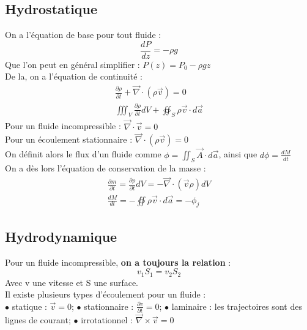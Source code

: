 \documentclass[../main.tex]{subfiles}
\begin{document}
\localtableofcontents
\subsection{Hydrostatique}
On a l'équation de base pour tout fluide : \\
\begin{equation}
    \frac{dP}{dz} = -\rho g
\end{equation}
Que l'on peut en général simplifier : $P(z) = P_0 -\rho gz$\\

De la, on a l'équation de continuité : \\
\begin{equation}
\begin{split}
    \frac{\partial \rho}{\partial t} + \vec{\nabla} \cdot (\rho \vec{v}) = 0 \\
    \iiint_V  \frac{\partial \rho}{\partial t} dV + \oiint_S \rho \vec{v} \cdot d \vec{a}
\end{split}
\end{equation}
Pour un fluide incompressible : $\vec{\nabla} \cdot \vec{v} = 0$\\
Pour un écoulement stationnaire : $\vec{\nabla} \cdot (\rho \vec{v}) = 0$\\

On définit alors le flux d'un fluide comme $\phi = \iint_S \vec{A}\cdot d\vec{a}$, ainsi que $d\phi = \frac{dM}{dt}$\\

On a dès lors l'équation de conservation de la masse : \\
\begin{equation}
    \begin{split}
        \frac{\partial m}{\partial t} = \frac{\partial \rho}{\partial t} dV = -\vec{\nabla} \cdot (\vec{v} \rho)dV\\
        \frac{dM}{dt} = -\oiint \rho \vec{v}\cdot d\vec{a} = -\phi_j
    \end{split}
\end{equation}

\subsection{Hydrodynamique}
Pour un fluide incompressible, \textbf{on a toujours la relation} : \\
\begin{equation}
    v_1S_1 = v_2 S_2
\end{equation}
Avec v une vitesse et S une surface.\\
Il existe plusieurs types d'écoulement pour un fluide : \\
$\bullet$ statique : $\vec{v} = 0$; $\bullet$ stationnaire : $\frac{\partial v}{\partial t} = 0$; $\bullet$ laminaire : les trajectoires sont des lignes de courant; $\bullet$ irrotationnel : $\vec{\nabla}\times \vec{v} = 0$\\
\end{document}
